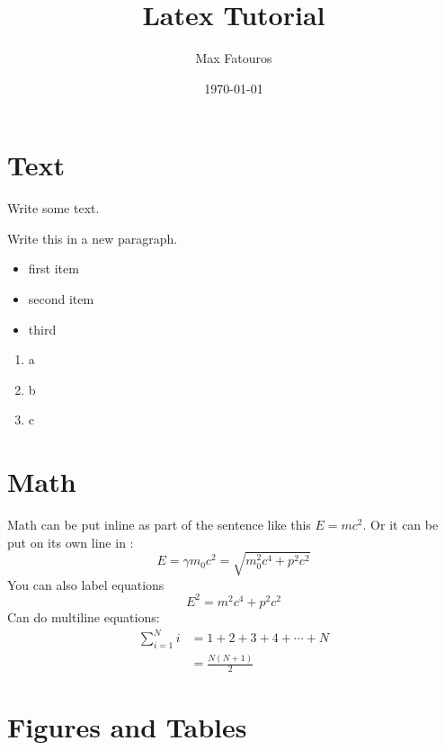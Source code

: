 \documentclass[12pt]{report}
\title{Latex Tutorial}
\author{Max Fatouros}
\date{\today}
\begin{document}
\maketitle

\tableofcontents
\newpage


\section{Text}\label{sec:text}
    Write some text.

    Write this in a new paragraph.

    
    \begin{itemize}
        \item first item
        \item second item
        \item third
    \end{itemize}

    \begin{enumerate}
        \item a
        \item b
        \item c
    \end{enumerate}


\section{Math}\label{sec:math}
    Math can be put inline as part of the sentence like this $E = mc^2$. Or it can be put on its own line in :
    \[
        E = \gamma m_0c^2 = \sqrt{m_0^2c^4 + p^2c^2}
    \]
    You can also label equations
    \begin{equation}\label{eq:energy-momentum}
        E^2 = m^2c^4 + p^2c^2
    \end{equation}
    Can do multiline equations:
    \begin{align*}
        \sum^N_{i=1} i &= 1 + 2 + 3 + 4 + \cdots + N\\
                       &= \frac{N(N+1)}{2}
    \end{align*}

\section{Figures and Tables}
    \lipsum[1]
    
\end{document}
